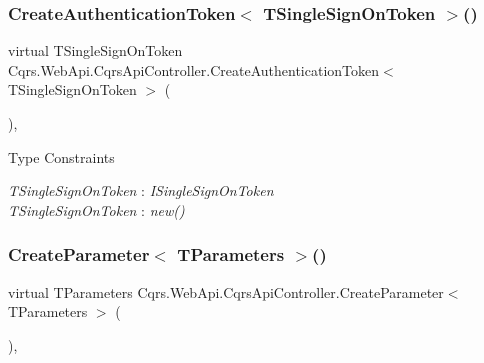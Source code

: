 \subsubsection{\texorpdfstring{Create\+Authentication\+Token$<$ T\+Single\+Sign\+On\+Token $>$()}{CreateAuthenticationToken< TSingleSignOnToken >()}}
{\footnotesize\ttfamily virtual T\+Single\+Sign\+On\+Token Cqrs.\+Web\+Api.\+Cqrs\+Api\+Controller.\+Create\+Authentication\+Token$<$ T\+Single\+Sign\+On\+Token $>$ (\begin{DoxyParamCaption}{ }\end{DoxyParamCaption})\hspace{0.3cm}{\ttfamily [protected]}, {\ttfamily [virtual]}}

\begin{Desc}
\item[Type Constraints]\begin{description}
\item[{\em T\+Single\+Sign\+On\+Token} : {\em I\+Single\+Sign\+On\+Token}]\item[{\em T\+Single\+Sign\+On\+Token} : {\em new()}]\end{description}
\end{Desc}
\mbox{\label{classCqrs_1_1WebApi_1_1CqrsApiController_a157e6f8a2f1ec94decfc8c96f74962a2_a157e6f8a2f1ec94decfc8c96f74962a2}} 
\subsubsection{\texorpdfstring{Create\+Parameter$<$ T\+Parameters $>$()}{CreateParameter< TParameters >()}}
{\footnotesize\ttfamily virtual T\+Parameters Cqrs.\+Web\+Api.\+Cqrs\+Api\+Controller.\+Create\+Parameter$<$ T\+Parameters $>$ (\begin{DoxyParamCaption}{ }\end{DoxyParamCaption})\hspace{0.3cm}{\ttfamily [protected]}, {\ttfamily [virtual]}}

